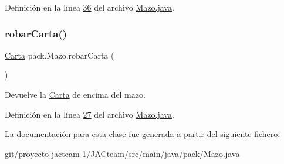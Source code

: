 Definición en la línea \mbox{\hyperlink{_mazo_8java_source_l00036}{36}} del archivo \mbox{\hyperlink{_mazo_8java_source}{Mazo.\+java}}.

\mbox{\label{classpack_1_1_mazo_a682be7abe3f14aed753a41c6f02e1cc8}} 
\subsubsection{\texorpdfstring{robarCarta()}{robarCarta()}}
{\footnotesize\ttfamily \mbox{\hyperlink{classpack_1_1_carta}{Carta}} pack.\+Mazo.\+robar\+Carta (\begin{DoxyParamCaption}{ }\end{DoxyParamCaption})}

\begin{DoxyReturn}{Devuelve}
la \mbox{\hyperlink{classpack_1_1_carta}{Carta}} de encima del mazo. 
\end{DoxyReturn}


Definición en la línea \mbox{\hyperlink{_mazo_8java_source_l00027}{27}} del archivo \mbox{\hyperlink{_mazo_8java_source}{Mazo.\+java}}.



La documentación para esta clase fue generada a partir del siguiente fichero\+:\begin{DoxyCompactItemize}
\item 
git/proyecto-\/jacteam-\/1/\+J\+A\+Cteam/src/main/java/pack/Mazo.\+java\end{DoxyCompactItemize}
